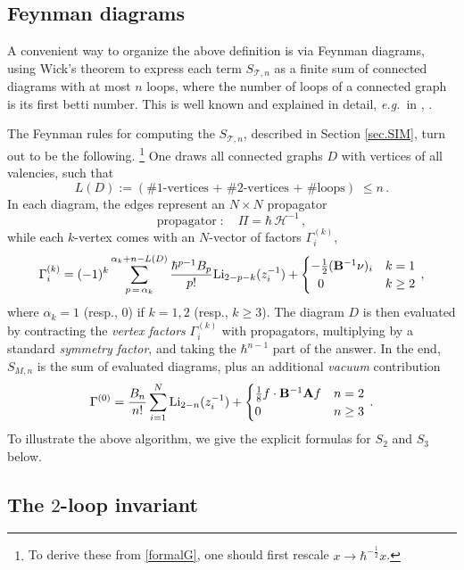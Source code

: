 \documentclass[12pt]{amsart}
\newcommand{\lbl}{\label}
\renewcommand{\eta}{\nu}
\theoremstyle{definition}
\def\be{  \begin{equation} }
\def\ee{  \end{equation} }
\newcommand{\CH}{\mathcal{H}}
\newcommand{\CT}{\mathcal{T}}
\newcommand{\Li}{{\rm Li}}
\newcommand{\eg}{\emph{e.g.}}
\newcommand{\mb}{\mathbf}
\numberwithin{equation}{section}
\begin{document}
\subsection{Feynman diagrams}
\lbl{sub.feynman2}

A convenient way to organize the above definition is via Feynman diagrams, 
using Wick's theorem to express each term $S_{\CT,n}$ as a finite sum of 
connected diagrams with at most $n$ loops, where the number of loops of
a connected graph is its first betti number. This is well known and 
explained in detail, \eg\ in \cite[Ch.9]{MirrorSym}, \cite{BIZ,Polyak}.

The Feynman rules for computing the $S_{\CT,n}$, described in Section \ref{sec.SIM}, turn out to be the following.%
%
\footnote{To derive these from \eqref{formalG}, one should first rescale $x\to \hbar^{-\frac12}x$.} %
One draws all connected graphs $D$ with vertices of 
all valencies, such that
%
\be 
\lbl{eq.LD} 
L(D) := (\text{\# 1-vertices + \# 2-vertices + \# loops}) \;\leq n\,. 
\ee
%
In each diagram, the edges represent an $N\times N$ propagator
%
\be \text{propagator}\; :\quad \Pi=\hbar\,\CH^{-1}\,,
\ee
%
while each $k$-vertex comes with an $N$-vector of factors $\Gamma^{(k)}_i$,
%
\be 
\label{vertexintro}  
\Gamma^{(k)}_i = (-1)^k\sum_{p\,
=\,\alpha_k}^{\alpha_k +n-L(D)}\frac{\hbar^{p-1}B_p}{p!}\Li_{2-p-k}(z_i^{-1}) 
+ \begin{cases} -\tfrac12(\mb B^{-1}\eta)_i & k= 1 \\ \;\;0 & k \geq 2 
\end{cases}\,,
\ee
%
where $\alpha_k = 1$ (resp., $0$) if $k=1,2$ (resp., $k\geq 3$).
The diagram $D$ is then evaluated by contracting the \emph{vertex factors} $\Gamma^{(k)}_i$ with 
propagators, multiplying by a standard {\em symmetry factor}, and taking the 
$\hbar^{n-1}$ part of the answer. In the end, $S_{M,n}$ is the sum of 
evaluated diagrams, plus an additional {\em vacuum} contribution
%
\be 
\label{vacintro} 
\Gamma^{(0)} = \frac{B_n}{n!}\sum_{i=1}^N\Li_{2-n}(z_i^{-1}) 
+ \begin{cases} \tfrac18f\cdot\mb B^{-1}\mb Af & n=2 \\ 0 & n\geq 3 
\end{cases}\,.
\ee
%
To illustrate the above algorithm, we give the explicit formulas
for $S_2$ and $S_3$ below.

\subsection{The $2$-loop invariant}
\lbl{sub.2loop}
\end{document}
